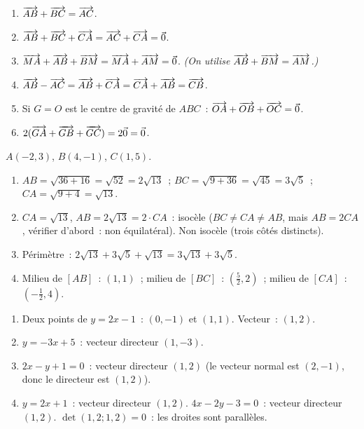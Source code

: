 
\begin{enumerate}
  \item $\overrightarrow{AB}+\overrightarrow{BC}=\overrightarrow{AC}$.
  \item $\overrightarrow{AB}+\overrightarrow{BC}+\overrightarrow{CA}=\overrightarrow{AC}+\overrightarrow{CA}=\vec{0}$.
  \item $\overrightarrow{MA}+\overrightarrow{AB}+\overrightarrow{BM}=\overrightarrow{MA}+\overrightarrow{AM}=\vec{0}$.
        \emph{(On utilise $\overrightarrow{AB}+\overrightarrow{BM}=\overrightarrow{AM}$.)}
  \item $\overrightarrow{AB}-\overrightarrow{AC}=\overrightarrow{AB}+\overrightarrow{CA}=\overrightarrow{CA}+\overrightarrow{AB}=\overrightarrow{CB}$.
  \item Si $G=O$ est le centre de gravité de $ABC$~: $\overrightarrow{OA}+\overrightarrow{OB}+\overrightarrow{OC}=\vec{0}$.
  \item $2(\overrightarrow{GA}+\overrightarrow{GB}+\overrightarrow{GC})=2\vec{0}=\vec{0}$.
\end{enumerate}


$A(-2,3)$, $B(4,-1)$, $C(1,5)$.
\begin{enumerate}
  \item $AB=\sqrt{36+16}=\sqrt{52}=2\sqrt{13}$~;
        $BC=\sqrt{9+36}=\sqrt{45}=3\sqrt{5}$~;
        $CA=\sqrt{9+4}=\sqrt{13}$.
  \item $CA=\sqrt{13}$, $AB=2\sqrt{13}=2\cdot CA$~: isoc\`ele ($BC\ne CA\ne AB$, mais
        $AB=2CA$, v\'erifier d'abord~: non \'equilat\'eral). Non isoc\`ele (trois c\^ot\'es distincts).
  \item P\'erim\`etre~: $2\sqrt{13}+3\sqrt{5}+\sqrt{13}=3\sqrt{13}+3\sqrt{5}$.
  \item Milieu de $[AB]$~: $(1,1)$~; milieu de $[BC]$~: $(\frac{5}{2},2)$~;
        milieu de $[CA]$~: $(-\frac{1}{2},4)$.
\end{enumerate}


\begin{enumerate}
  \item Deux points de $y=2x-1$~: $(0,-1)$ et $(1,1)$. Vecteur~: $(1,2)$.\checkmark
  \item $y=-3x+5$~: vecteur directeur $(1,-3)$.
  \item $2x-y+1=0$~: vecteur directeur $(1,2)$
        (le vecteur normal est $(2,-1)$, donc le directeur est $(1,2)$).
  \item $y=2x+1$~: vecteur directeur $(1,2)$.
        $4x-2y-3=0$~: vecteur directeur $(1,2)$.
        $\det(1,2;1,2)=0$~: les droites sont parall\`eles.\checkmark
\end{enumerate}

